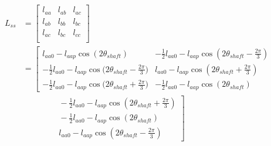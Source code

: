 \begin{equation*}
    \begin{aligned}
        L_{ss} &= 
        \begin{bmatrix}
            l_{aa} & l_{ab} & l_{ac} \\
            l_{ab} & l_{bb} & l_{bc} \\
            l_{ac} & l_{bc} & l_{cc} \\
        \end{bmatrix}\\
        &=
        \left[\begin{matrix}
        l_{aa0} - l_{aap} \cos{(2\theta_{shaft})} & -\frac{1}{2} l_{aa0} - l_{aap} \cos{(2\theta_{shaft} - \frac{2\pi}{3})} \\
        -\frac{1}{2}l_{aa0} - l_{aap} \cos{(2\theta_{shaft}-\frac{2\pi}{3}}) & l_{aa0} - l_{aap} \cos{(2\theta_{shaft}+\frac{2\pi}{3})}\\
        -\frac{1}{2}l_{aa0} - l_{aap} \cos{(2\theta_{shaft}+\frac{2\pi}{3}}) & -\frac{1}{2} l_{aa0} - l_{aap} \cos{(2\theta_{shaft})}
        \end{matrix}\right.\\
        &\qquad\qquad
        \left.\begin{matrix}
        {}-\frac{1}{2} l_{aa0} - l_{aap} \cos{(2\theta_{shaft} + \frac{2\pi}{3})}\\
        {}-\frac{1}{2} l_{aa0} - l_{aap} \cos{(2\theta_{shaft})}\\
        {}l_{aa0} - l_{aap} \cos{(2\theta_{shaft}-\frac{2\pi}{3})}
        \end{matrix}\right]
    \end{aligned}
\end{equation*}

